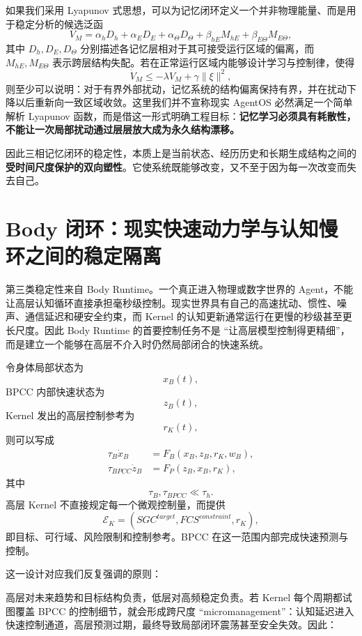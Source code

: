 如果我们采用 Lyapunov 式思想，可以为记忆闭环定义一个并非物理能量、而是用于稳定分析的候选泛函
\[
V_M
=
\alpha_h D_h
+
\alpha_E D_E
+
\alpha_\Theta D_\Theta
+
\beta_{hE}M_{hE}
+
\beta_{E\Theta}M_{E\Theta},
\]
其中 $D_h,D_E,D_\Theta$ 分别描述各记忆层相对于其可接受运行区域的偏离，而 $M_{hE},M_{E\Theta}$ 表示跨层结构失配。若在正常运行区域内能够设计学习与控制律，使得
\[
\dot V_M
\leq
-\lambda V_M
+
\gamma\|\xi\|^2,
\]
则至少可以说明：对于有界外部扰动，记忆系统的结构偏离保持有界，并在扰动下降以后重新向一致区域收敛。这里我们并不宣称现实 AgentOS 必然满足一个简单解析 Lyapunov 函数，而是借这一形式明确工程目标：\textbf{记忆学习必须具有耗散性，不能让一次局部扰动通过层层放大成为永久结构漂移。}

因此三相记忆闭环的稳定性，本质上是当前状态、经历历史和长期生成结构之间的\textbf{受时间尺度保护的双向塑性}。它使系统既能够改变，又不至于因为每一次改变而失去自己。

\section{Body 闭环：现实快速动力学与认知慢环之间的稳定隔离}

第三类稳定性来自 Body Runtime。一个真正进入物理或数字世界的 Agent，不能让高层认知循环直接承担毫秒级控制。现实世界具有自己的高速扰动、惯性、噪声、通信延迟和硬安全约束，而 Kernel 的认知更新通常运行在更慢的秒级甚至更长尺度。因此 Body Runtime 的首要控制任务不是 ``让高层模型控制得更精细''，而是建立一个能够在高层不介入时仍然局部闭合的快速系统。

令身体局部状态为
\[
x_B(t),
\]
BPCC 内部快速状态为
\[
z_B(t),
\]
Kernel 发出的高层控制参考为
\[
r_K(t),
\]
则可以写成
\[
\begin{aligned}
\tau_B\dot x_B
&=
F_B(x_B,z_B,r_K,w_B),\\
\tau_{BPCC}\dot z_B
&=
F_P(z_B,x_B,r_K),
\end{aligned}
\]
其中
\[
\tau_B,\tau_{BPCC}
\ll
\tau_h.
\]
高层 Kernel 不直接规定每一个微观控制量，而提供
\[
\mathcal E_K
=
\left(
SGC^{target},
FCS^{constraint},
r_K
\right),
\]
即目标、可行域、风险限制和控制参考。BPCC 在这一范围内部完成快速预测与控制。

这一设计对应我们反复强调的原则：
\begin{statementbox}
\centering
{}
\end{statementbox}
高层对未来趋势和目标结构负责，低层对高频稳定负责。若 Kernel 每个周期都试图覆盖 BPCC 的控制细节，就会形成跨尺度 ``micromanagement''：认知延迟进入快速控制通道，高层预测过期，最终导致局部闭环震荡甚至安全失效。因此：
\begin{statementbox}
\centering
{}
\end{statementbox}

